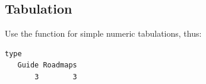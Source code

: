 \subsection*{Tabulation}
Use the function  for simple numeric tabulations,
thus:
\begin{knitrout}
\color{fgcolor}\begin{kframe}
\begin{alltt}
 \hlkwb{<-} \hlstd{(}\hlstd{,}\hlstd{,}\hlstd{,}\hlstd{,}
          \hlstd{,}\hlstd{)}
\end{alltt}
\begin{verbatim}
type
   Guide Roadmaps 
       3        3 
\end{verbatim}
\end{kframe}
\end{knitrout}

